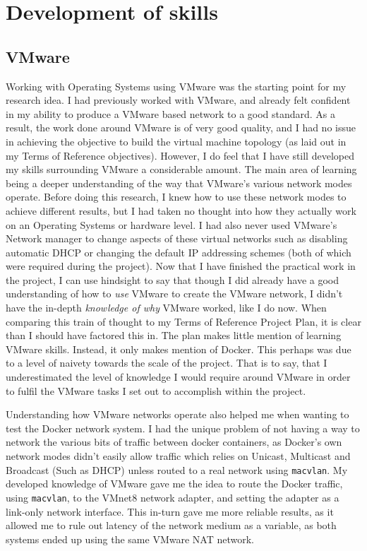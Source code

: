 \section{Development of skills}
\subsection{VMware}%
Working with Operating Systems using VMware was the starting point for my research idea. I had previously worked with VMware, and already felt confident in my ability to produce a VMware based network to a good standard. As a result, the work done around VMware is of very good quality, and I had no issue in achieving the objective to build the virtual machine topology (as laid out in my Terms of Reference objectives). However, I do feel that I have still developed my skills surrounding VMware a considerable amount. The main area of learning being a deeper understanding of the way that VMware's various network modes operate. Before doing this research, I knew how to use these network modes to achieve different results, but I had taken no thought into how they actually work on an Operating Systems or hardware level. I had also never used VMware's Network manager to change aspects of these virtual networks such as disabling automatic DHCP or changing the default IP addressing schemes (both of which were required during the project). Now that I have finished the practical work in the project, I can use hindsight to say that though I did already have a good understanding of how to \emph{use} VMware to create the VMware network, I didn't have the in-depth \emph{knowledge of why} VMware worked, like I do now. When comparing this train of thought to my Terms of Reference Project Plan, it is clear than I should have factored this in. The plan makes little mention of learning VMware skills. Instead, it only makes mention of Docker. This perhaps was due to a level of naivety towards the scale of the project. That is to say, that I underestimated the level of knowledge I would require around VMware in order to fulfil the VMware tasks I set out to accomplish within the project.

Understanding how VMware networks operate also helped me when wanting to test the Docker network system. I had the unique problem of not having a way to network the various bits of traffic between docker containers, as Docker's own network modes didn't easily allow traffic which relies on Unicast, Multicast and Broadcast (Such as DHCP) unless routed to a real network using \texttt{macvlan}. My developed knowledge of VMware gave me the idea to route the Docker traffic, using \texttt{macvlan}, to the VMnet8 network adapter, and setting the adapter as a link-only network interface. This in-turn gave me more reliable results, as it allowed me to rule out latency of the network medium as a variable, as both systems ended up using the same VMware NAT network.

